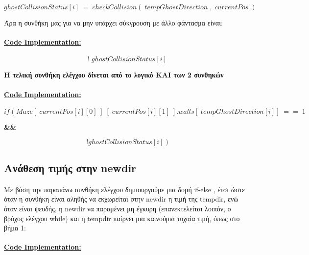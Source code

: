 \documentclass[12pt,a4paper]{article}
\newcommand{\lt}{\latintext}
\newcommand{\gt}{\greektext}
\begin{document}
	\begin{equation*}
	ghostCollisionStatus[i]\; =\; checkCollision(\;tempGhostDirection \;, \; currentPos\;)
	\end{equation*}
	
	Άρα η συνθήκη μας για να μην υπάρχει σύκγρουση με άλλο φάντασμα είναι:
	
	
		\paragraph{\underline{\lt Code Implementation:}}
	
	\begin{equation*}
!\; ghostCollisionStatus[i]
	\end{equation*}
	\begin{center}
		\textbf{Η τελική συνθήκη ελέγχου δίνεται από το λογικό ΚΑΙ των 2 συνθηκών}	
	\end{center}
\paragraph{\underline{\lt Code Implementation:}}
\begin{equation*}
if \; (\;Maze[\;currentPos[i][0]\;]\;[\;currentPos[i][1]\;].walls[\;tempGhostDirection[i]] \;== \;1 
\end{equation*}
\begin{center}
\textbf{\&\&}
\end{center}
\begin{equation*}   !ghostCollisionStatus[i]\; ) 

\end{equation*}
\subsection{Ανάθεση τιμής στην \lt newdir}
\paragraph*{} \gt Με βάση την παραπάνω συνθήκη ελέγχου δημιουργούμε μια δομή \lt if-else \gt, έτσι ώστε όταν η συνθήκη είναι αληθής να εκχωρείται στην \lt newdir \gt η τιμή της \lt tempdir, \gt ενώ όταν είναι ψευδής, η \lt newdir \gt να παραμένει μη έγκυρη (επανεκτελείται λοιπόν, ο βρόχος ελέγχου \lt while) \gt και η \lt tempdir \gt παίρνει μια καινούρια τυχαία τιμή, όπως στο βήμα 1: \\
\paragraph{\underline{\lt Code Implementation:}}
\end{document}
